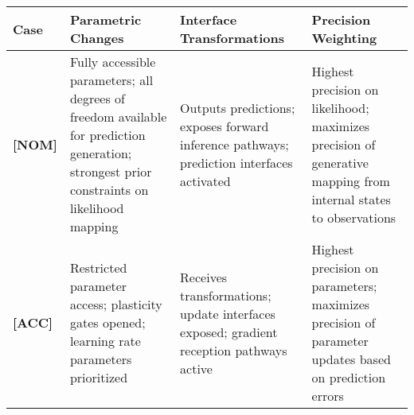 \begin{longtable}[]{@{}llll@{}}
\toprule
\begin{minipage}[b]{0.08\columnwidth}\raggedright
Case\strut
\end{minipage} & \begin{minipage}[b]{0.24\columnwidth}\raggedright
Parametric Changes\strut
\end{minipage} & \begin{minipage}[b]{0.33\columnwidth}\raggedright
Interface Transformations\strut
\end{minipage} & \begin{minipage}[b]{0.24\columnwidth}\raggedright
Precision Weighting\strut
\end{minipage}\tabularnewline
\midrule
\endhead
\begin{minipage}[t]{0.08\columnwidth}\raggedright
\textbf{{[}NOM{]}}\strut
\end{minipage} & \begin{minipage}[t]{0.24\columnwidth}\raggedright
Fully accessible parameters; all degrees of freedom available for
prediction generation; strongest prior constraints on likelihood
mapping\strut
\end{minipage} & \begin{minipage}[t]{0.33\columnwidth}\raggedright
Outputs predictions; exposes forward inference pathways; prediction
interfaces activated\strut
\end{minipage} & \begin{minipage}[t]{0.24\columnwidth}\raggedright
Highest precision on likelihood; maximizes precision of generative
mapping from internal states to observations\strut
\end{minipage}\tabularnewline
\begin{minipage}[t]{0.08\columnwidth}\raggedright
\textbf{{[}ACC{]}}\strut
\end{minipage} & \begin{minipage}[t]{0.24\columnwidth}\raggedright
Restricted parameter access; plasticity gates opened; learning rate
parameters prioritized\strut
\end{minipage} & \begin{minipage}[t]{0.33\columnwidth}\raggedright
Receives transformations; update interfaces exposed; gradient reception
pathways active\strut
\end{minipage} & \begin{minipage}[t]{0.24\columnwidth}\raggedright
Highest precision on parameters; maximizes precision of parameter
updates based on prediction errors\strut

\end{minipage}
\end{longtable}
